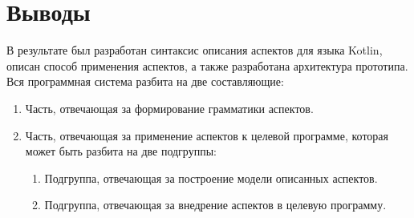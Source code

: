 \section{Выводы}
\label{sec:design_conclusion}
В результате был разработан синтаксис описания аспектов для языка Kotlin,
описан способ применения аспектов, а также разработана архитектура прототипа.
Вся программная система разбита на две составляющие:
\begin{enumerate}
	\item Часть, отвечающая за формирование грамматики аспектов.
	\item Часть, отвечающая за применение аспектов к целевой программе, которая может быть разбита на две подгруппы:
	\begin{enumerate}
		\item Подгруппа, отвечающая за построение модели описанных аспектов.
		\item Подгруппа, отвечающая за внедрение аспектов в целевую программу.
	\end{enumerate}
\end{enumerate}
